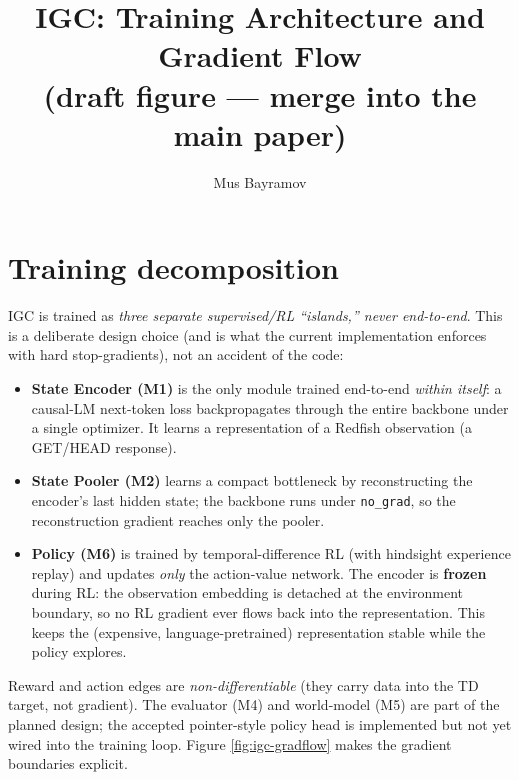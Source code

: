 \documentclass[11pt]{article}
\title{\textbf{IGC: Training Architecture and Gradient Flow}\\[2pt]
       \large (draft figure --- merge into the main paper)}
\author{Mus Bayramov}
\date{}
\begin{document}
\maketitle

\section{Training decomposition}

IGC is trained as \emph{three separate supervised/RL ``islands,'' never end-to-end}. This is a
deliberate design choice (and is what the current implementation enforces with hard
stop-gradients), not an accident of the code:

\begin{itemize}\itemsep2pt
  \item \textbf{State Encoder (M1)} is the only module trained end-to-end \emph{within itself}: a
  causal-LM next-token loss backpropagates through the entire backbone under a single optimizer.
  It learns a representation of a Redfish observation (a GET/HEAD response).
  \item \textbf{State Pooler (M2)} learns a compact bottleneck by reconstructing the encoder's last
  hidden state; the backbone runs under \texttt{no\_grad}, so the reconstruction gradient reaches
  only the pooler.
  \item \textbf{Policy (M6)} is trained by temporal-difference RL (with hindsight experience replay)
  and updates \emph{only} the action-value network. The encoder is \textbf{frozen} during RL: the
  observation embedding is detached at the environment boundary, so no RL gradient ever flows back
  into the representation. This keeps the (expensive, language-pretrained) representation stable
  while the policy explores.
\end{itemize}

Reward and action edges are \emph{non-differentiable} (they carry data into the TD target, not
gradient). The evaluator (M4) and world-model (M5) are part of the planned design; the accepted
pointer-style policy head is implemented but not yet wired into the training loop. Figure
\ref{fig:igc-gradflow} makes the gradient boundaries explicit.
\end{document}
